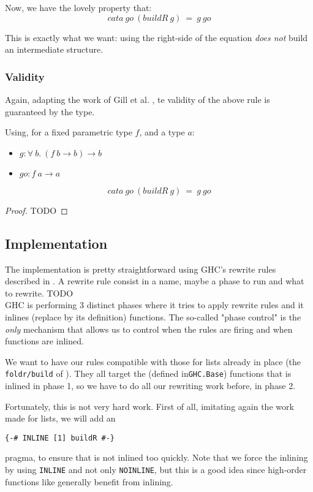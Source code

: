 Now, we have the lovely property that:
$$cata\ go\ (buildR\ g)\ =\ g\ go$$

This is exactly what we want: using the right-side of the equation \emph{does not}
build an intermediate structure.

\subsubsection{Validity}
Again, adapting the work of Gill et al. \cite{Gill:1993:SCD:165180.165214}, te validity of the above rule is guaranteed by the type.

\begin{theorem}
Using, for a fixed parametric type $f$, and a type $a$:
\begin{itemize}
	\item $g : \forall\ b.\ (f\ b \to b) \to b$
	\item $go : f\ a \to a $
\end{itemize}
$$cata\ go\ (buildR\ g)\ =\ g\ go$$
\end{theorem}
\begin{proof}
	TODO
\end{proof}

\subsection{Implementation}
The implementation is pretty straightforward using GHC's rewrite rules described in \cite{pbr}. A rewrite rule consist in a name, maybe a phase to run and what to rewrite. TODO\\
GHC is performing 3 distinct phases where it tries to apply rewrite rules and it inlines (replace by its definition) functions. The so-called "phase control" is the \emph{only} mechanism that allows us to control when the rules are firing and when functions are inlined.

We want to have our rules compatible with those for lists already in place (the \verb|foldr/build| of \cite{Gill:1993:SCD:165180.165214}). They all target the  (defined in\verb|GHC.Base|) functions that is inlined in phase 1, so we have to do all our rewriting work before, in phase 2.

Fortunately, this is not very hard work. First of all, imitating again the work made for lists, we will add an 
\begin{verbatim}
{-# INLINE [1] buildR #-}
\end{verbatim}
pragma, to ensure that  is not inlined too quickly. Note that we force the inlining by using \verb|INLINE| and not only \verb|NOINLINE|, but this is a good idea since high-order functions like  generally benefit from inlining. 

